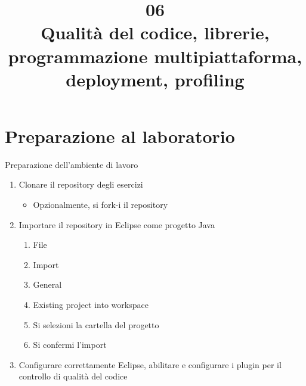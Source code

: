 \documentclass[presentation]{beamer}
\title[Code quality]{06\\ Qualità del codice, librerie, programmazione multipiattaforma, deployment, profiling}
\begin{document}
\frame[label=coverpage]{\titlepage}

\section{Preparazione al laboratorio}

\begin{frame}{Preparazione dell'ambiente di lavoro}
	\begin{enumerate}
		\item Clonare il repository degli esercizi
		\begin{itemize}
            \item Opzionalmente, si fork-i il repository
		\end{itemize}
		\item Importare il repository in Eclipse come progetto Java
		\begin{enumerate}
			\item File
			\item Import
			\item General
			\item Existing project into workspace
			\item Si selezioni la cartella del progetto
			\item Si confermi l'import
		\end{enumerate}
		\item \alert{Configurare correttamente Eclipse, abilitare e configurare i plugin per il controllo di qualità del codice}
	\end{enumerate}
\end{frame}
\end{document}
